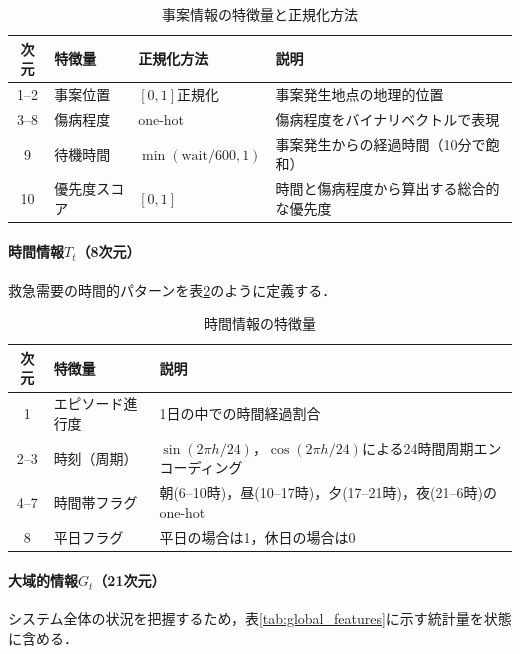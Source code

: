 \begin{table}[H]
\centering
\caption{事案情報の特徴量と正規化方法}
\label{tab:incident_feature_normalization}
\begin{tabularx}{\linewidth}{cllX}
\hline
次元 & 特徴量 & 正規化方法 & 説明 \\
\hline
1--2 & 事案位置 & $[0, 1]$正規化 & 事案発生地点の地理的位置 \\
3--8 & 傷病程度 & one-hot & 傷病程度をバイナリベクトルで表現 \\
9 & 待機時間 & $\min(\mathrm{wait} / 600, 1)$ & 事案発生からの経過時間（10分で飽和） \\
10 & 優先度スコア & $[0, 1]$ & 時間と傷病程度から算出する総合的な優先度 \\
\hline
\end{tabularx}
\end{table}


\paragraph{時間情報$T_t$（8次元）}

救急需要の時間的パターンを表\ref{tab:time_features}のように定義する．

\begin{table}[H]
\centering
\caption{時間情報の特徴量}
\label{tab:time_features}
\begin{tabularx}{\linewidth}{clX}
\hline
次元 & 特徴量 & 説明 \\
\hline
1 & エピソード進行度 & 1日の中での時間経過割合 \\
2--3 & 時刻（周期） & $\sin(2\pi h / 24)$，$\cos(2\pi h / 24)$による24時間周期エンコーディング \\
4--7 & 時間帯フラグ & 朝(6--10時)，昼(10--17時)，夕(17--21時)，夜(21--6時)のone-hot \\
8 & 平日フラグ & 平日の場合は1，休日の場合は0 \\
\hline
\end{tabularx}
\end{table}


\paragraph{大域的情報$G_t$（21次元）}

システム全体の状況を把握するため，表\ref{tab:global_features}に示す統計量を状態に含める．

